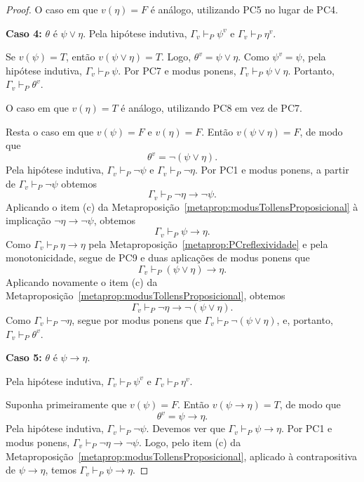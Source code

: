 \begin{proof}
    O caso em que $v(\eta)=F$ é análogo, utilizando PC5 no lugar de PC4.

    \textbf{Caso 4:} $\theta$ é $\psi\lor\eta$.
    Pela hipótese indutiva, $\Gamma_v\vdash_P \psi^v$ e $\Gamma_v\vdash_P \eta^v$.

    Se $v(\psi)=T$, então $v(\psi\lor\eta)=T$.
    Logo, $\theta^v=\psi\lor\eta$.
    Como $\psi^v=\psi$, pela hipótese indutiva, $\Gamma_v\vdash_P \psi$.
    Por PC7 e modus ponens, $\Gamma_v\vdash_P \psi\lor\eta$.
    Portanto, $\Gamma_v\vdash_P \theta^v$.

    O caso em que $v(\eta)=T$ é análogo, utilizando PC8 em vez de PC7.

    Resta o caso em que $v(\psi)=F$ e $v(\eta)=F$.
    Então $v(\psi\lor\eta)=F$, de modo que
    \[
        \theta^v=\neg(\psi\lor\eta).
    \]
    Pela hipótese indutiva,
        $\Gamma_v\vdash_P \neg\psi$ e $\Gamma_v\vdash_P \neg\eta$.
    Por PC1 e modus ponens, a partir de $\Gamma_v\vdash_P \neg\psi$ obtemos
    \[
        \Gamma_v\vdash_P \neg\eta\rightarrow\neg\psi.
    \]
    Aplicando o item (c) da Metaproposição~\ref{metaprop:modusTollensProposicional} à implicação $\neg\eta\rightarrow\neg\psi$, obtemos
    \[
        \Gamma_v\vdash_P \psi\rightarrow\eta.
    \]
    Como $\Gamma_v\vdash_P \eta\rightarrow\eta$ pela Metaproposição~\ref{metaprop:PCreflexividade} e pela monotonicidade, segue de PC9 e duas aplicações de modus ponens que
    \[
        \Gamma_v\vdash_P (\psi\lor\eta)\rightarrow\eta.
    \]
    Aplicando novamente o item (c) da Metaproposição~\ref{metaprop:modusTollensProposicional}, obtemos
    \[
        \Gamma_v\vdash_P \neg\eta\rightarrow\neg(\psi\lor\eta).
    \]
    Como $\Gamma_v\vdash_P \neg\eta$, segue por modus ponens que $\Gamma_v\vdash_P \neg(\psi\lor\eta)$, e, portanto, $\Gamma_v\vdash_P \theta^v$.

    \textbf{Caso 5:} $\theta$ é $\psi\rightarrow\eta$.

    Pela hipótese indutiva, $\Gamma_v\vdash_P \psi^v$ e $\Gamma_v\vdash_P \eta^v$.

    Suponha primeiramente que $v(\psi)=F$.
    Então $v(\psi\rightarrow\eta)=T$, de modo que
    \[
        \theta^v=\psi\rightarrow\eta.
    \]
    Pela hipótese indutiva, $\Gamma_v\vdash_P \neg\psi$.
    Devemos ver que $\Gamma_v\vdash_P \psi\rightarrow\eta$.
    Por PC1 e modus ponens, $\Gamma_v\vdash_P \neg\eta\rightarrow\neg\psi$.
    Logo, pelo item (c) da Metaproposição~\ref{metaprop:modusTollensProposicional}, aplicado à contrapositiva de $\psi\rightarrow\eta$, temos $\Gamma_v\vdash_P \psi\rightarrow\eta$.


\end{proof}
